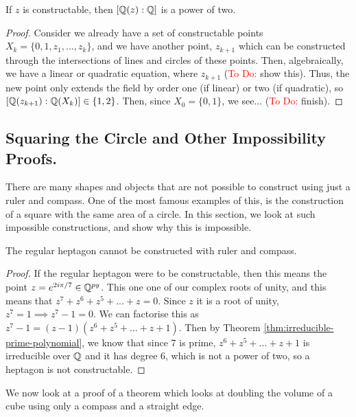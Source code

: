 \begin{theorem}\label{thm:power-of-two-construction}
    If $z$ is constructable, then $[\mathbb Q(z):\mathbb Q]$ is a power of two.
\end{theorem}

\begin{proof}  
    Consider we already have a set of constructable points $X_k = \{0,1,z_1,...,z_k\}$, and we have another point, $z_{k+1}$ which can be constructed through the intersections of lines and circles of these points. Then, algebraically, we have a linear or quadratic equation, where $z_{k+1}$ (\textcolor{red}{To Do:} show this).
    Thus, the new point only extends the field by order one (if linear) or two (if quadratic), so $[\mathbb Q(z_{k+1}):\mathbb Q(X_k)] \in \{1,2\}$. Then, since $X_0=\{0,1\}$, we see... (\textcolor{red}{To Do:} finish).

\end{proof}

\subsection{Squaring the Circle and Other Impossibility Proofs.}

There are many shapes and objects that are not possible to construct using just a ruler and compass. One of the most famous examples of this, is the construction of a square with the same area of a circle. In this section, we look at such impossible constructions, and show why this is impossible.

\begin{theorem}
    The regular heptagon cannot be constructed with ruler and compass.
\end{theorem}

\begin{proof}
    If the regular heptagon were to be constructable, then this means the point $z=e^{2i\pi/7} \in \mathbb Q^{py}$. This one one of our complex roots of unity, and this means that $z^7+z^6+z^5+...+z=0$. Since $z$ it is a root of unity, $z^7=1 \implies z^7 - 1 = 0$. We can factorise this as $z^7-1=(z-1)(z^6+z^5+...+z+1)$. Then by Theorem \ref{thm:irreducible-prime-polynomial}, we know that since 7 is prime, $z^6+z^5+...+z+1$ is irreducible over $\mathbb Q$ and it has degree 6, which is not a power of two, so a heptagon is not constructable.
\end{proof}

We now look at a proof of a theorem which looks at doubling the volume of a cube using only a compass and a straight edge.

